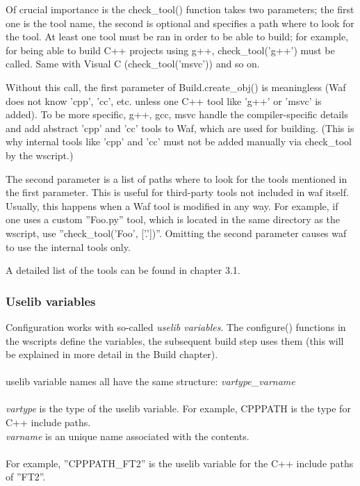 \documentclass[a4paper,10pt]{article}
\begin{document}
Of crucial importance is the check\_tool() function takes two parameters; the first one is the tool name, the second is optional and specifies a path where to look for the tool. At least one tool must be ran in order to be able to build; for example, for being able to build C++ projects using g++, check\_tool('g++') must be called. Same with Visual C (check\_tool('msvc')) and so on.

Without this call, the first parameter of Build.create\_obj() is meaningless (Waf does not know 'cpp', 'cc', etc. unless one C++ tool like 'g++' or 'msvc' is added). To be more specific, g++, gcc, msvc handle the compiler-specific details and add abstract 'cpp' and 'cc' tools to Waf, which are used for building. (This is why internal tools like 'cpp' and 'cc' must not be added manually via check\_tool by the wscript.)

The second parameter is a list of paths where to look for the tools mentioned in the first parameter. This is useful for third-party tools not included in waf itself. Usually, this happens when a Waf tool is modified in any way. For example, if one uses a custom ''Foo.py'' tool, which is located in the same directory as the wscript, use ''check\_tool('Foo', ['.'])''. Omitting the second parameter causes waf to use the internal tools only.

A detailed list of the tools can be found in chapter 3.1.

\subsubsection{Uselib variables}
Configuration works with so-called \emph{uselib variables}. The configure() functions in the wscripts define the variables, the subsequent build step uses them (this will be explained in more detail in the Build chapter). \\
\\
uselib variable names all have the same structure: \emph{vartype}\_\emph{varname}\\
\\
\emph{vartype} is the type of the uselib variable. For example, CPPPATH is the type for C++ include paths.\\
\emph{varname} is an unique name associated with the contents.\\\\
For example, ''CPPPATH\_FT2'' is the uselib variable for the C++ include paths of ''FT2''.\\\\
\end{document}
